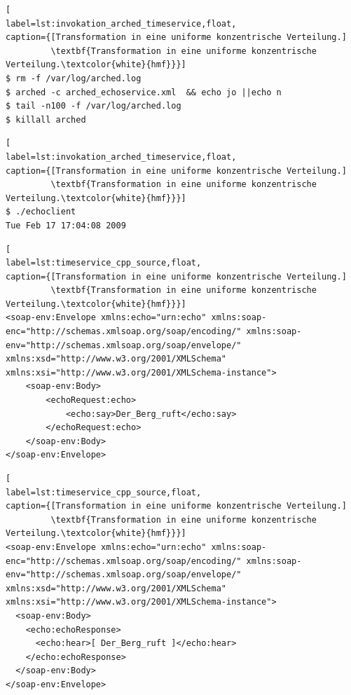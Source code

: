 \begin{lstlisting}[
label=lst:invokation_arched_timeservice,float,
caption={[Transformation in eine uniforme konzentrische Verteilung.]
         \textbf{Transformation in eine uniforme konzentrische Verteilung.\textcolor{white}{hmf}}}]
$ rm -f /var/log/arched.log
$ arched -c arched_echoservice.xml  && echo jo ||echo n
$ tail -n100 -f /var/log/arched.log
$ killall arched
\end{lstlisting}



\begin{lstlisting}[
label=lst:invokation_arched_timeservice,float,
caption={[Transformation in eine uniforme konzentrische Verteilung.]
         \textbf{Transformation in eine uniforme konzentrische Verteilung.\textcolor{white}{hmf}}}]
$ ./echoclient
Tue Feb 17 17:04:08 2009
\end{lstlisting}






\begin{lstlisting}[
label=lst:timeservice_cpp_source,float,
caption={[Transformation in eine uniforme konzentrische Verteilung.]
         \textbf{Transformation in eine uniforme konzentrische Verteilung.\textcolor{white}{hmf}}}]
<soap-env:Envelope xmlns:echo="urn:echo" xmlns:soap-enc="http://schemas.xmlsoap.org/soap/encoding/" xmlns:soap-env="http://schemas.xmlsoap.org/soap/envelope/" xmlns:xsd="http://www.w3.org/2001/XMLSchema" xmlns:xsi="http://www.w3.org/2001/XMLSchema-instance">
	<soap-env:Body>
		<echoRequest:echo>
			<echo:say>Der_Berg_ruft</echo:say>
		</echoRequest:echo>
	</soap-env:Body>
</soap-env:Envelope>
\end{lstlisting}



\begin{lstlisting}[
label=lst:timeservice_cpp_source,float,
caption={[Transformation in eine uniforme konzentrische Verteilung.]
         \textbf{Transformation in eine uniforme konzentrische Verteilung.\textcolor{white}{hmf}}}]
<soap-env:Envelope xmlns:echo="urn:echo" xmlns:soap-enc="http://schemas.xmlsoap.org/soap/encoding/" xmlns:soap-env="http://schemas.xmlsoap.org/soap/envelope/" xmlns:xsd="http://www.w3.org/2001/XMLSchema" xmlns:xsi="http://www.w3.org/2001/XMLSchema-instance">
  <soap-env:Body>
    <echo:echoResponse>
      <echo:hear>[ Der_Berg_ruft ]</echo:hear>
    </echo:echoResponse>
  </soap-env:Body>
</soap-env:Envelope>
\end{lstlisting}

